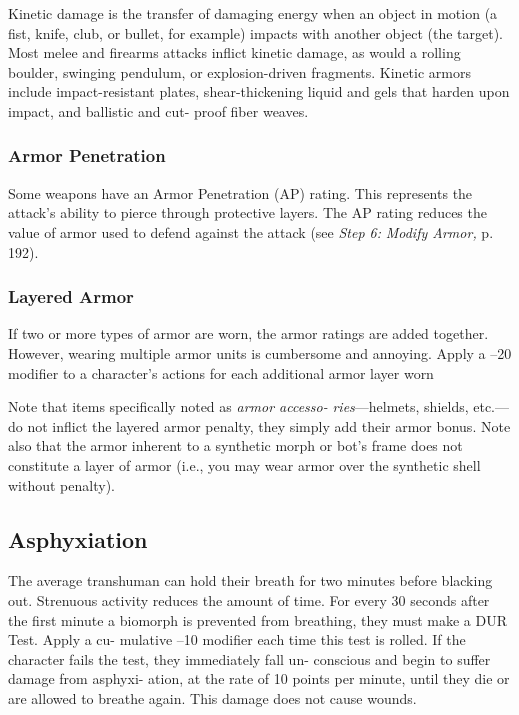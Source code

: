 Kinetic damage is the transfer of damaging energy 
when an object in motion (a fist, knife, club, or bullet, 
for example) impacts with another object (the target). 
Most melee and firearms attacks inflict kinetic damage, 
as would a rolling boulder, swinging pendulum, or 
explosion-driven fragments. Kinetic armors include 
impact-resistant plates, shear-thickening liquid and 
gels that harden upon impact, and ballistic and cut-
proof fiber weaves.

\subsubsection{Armor Penetration}

Some weapons have an Armor Penetration (AP) rating. 
This represents the attack's ability to pierce through 
protective layers. The AP rating reduces the value of 
armor used to defend against the attack (see \textit{Step 6: }
\textit{Modify Armor,} p. 192).

\subsubsection{Layered Armor}

If two or more types of armor are worn, the armor 
ratings are added together. However, wearing multiple 
armor units is cumbersome and annoying. Apply a –20 
modifier to a character's actions for each additional 
armor layer worn

Note that items specifically noted as \textit{armor accesso-}
\textit{ries}—helmets, shields, etc.—do not inflict the layered 
armor penalty, they simply add their armor bonus. 
Note also that the armor inherent to a synthetic 
morph or bot's frame does not constitute a layer of 
armor (i.e., you may wear armor over the synthetic 
shell without penalty).

\subsection{Asphyxiation}

The average transhuman can hold their breath for 
two minutes before blacking out. Strenuous activity 
reduces the amount of time. For every 30 seconds 
after the first minute a biomorph is prevented from 
breathing, they must make a DUR Test. Apply a cu-
mulative –10 modifier each time this test is rolled. If 
the character fails the test, they immediately fall un-
conscious and begin to suffer damage from asphyxi-
ation, at the rate of 10 points per minute, until they 
die or are allowed to breathe again. This damage does 
not cause wounds.

